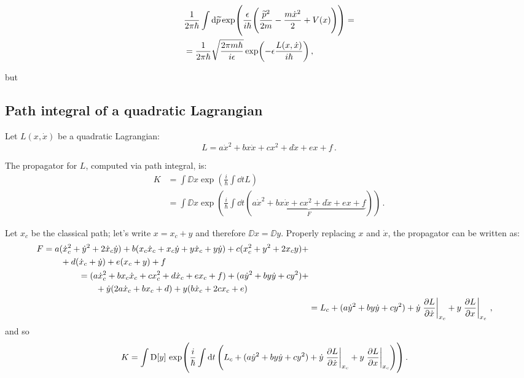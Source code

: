 \documentclass[main.tex]{subfiles}
\begin{document}
%
\begin{subequations}
\begin{align}
  &\frac{1}{2 \pi \hbar} \int  \dd{\widetilde{p}} 
  \exp(\frac{\epsilon}{i \hbar} \qty(\frac{\widetilde{p}^2 }{2m} - \frac{m \dot{x}^2}{2} + V(x))) =  \\
  &= \frac{1}{2 \pi \hbar} \sqrt{\frac{2 \pi m \hbar }{i \epsilon }} \exp(- \epsilon  \frac{L(x, \dot{x})}{i \hbar}) 
  \,,
\end{align}
\end{subequations}

but 

\subsection{Path integral of a quadratic Lagrangian}

Let \(L(x,\dot{x})\) be a quadratic Lagrangian:
\begin{equation}
  L = a\dot{x}^2 + bx\dot{x} + cx^2 + d\dot{x} + ex + f
  \,.
\end{equation}

The propagator for $L$, computed via path integral, is:
%
\begin{subequations}
  \begin{align}
    K &= \int\DD{x} \exp(\frac{i}{\hbar}\int \dd{t} L) \\
    &= \int\DD{x} \exp(\frac{i}{\hbar}\int \dd{t} ( \underbrace{a\dot{x}^2 + bx\dot{x} + cx^2 + d\dot{x} + ex + f}_F) )
    \,.
  \end{align}
\end{subequations}

Let $x_c$ be the classical path; let's write $x = x_c + y$ and therefore $\DD{x} = \DD{y}$. Properly replacing $x$ and $\dot{x}$, the propagator can be written as:
%
\begin{subequations}
\begin{align}
\begin{split}
F &= a (\dot{x}_c^2+\dot{y}^2+2\dot{x}_c\dot{y}) + b(x_c\dot{x}_c+x_c\dot{y}+y\dot{x}_c+y\dot{y}) + c(x_c^2+y^2+2x_cy) +\\&\qquad+ d(\dot{x}_c+\dot{y}) + e(x_c+y) + f
\end{split} \\
\begin{split}
&= (a\dot{x}_c^2+bx_c\dot{x}_c+cx_c^2+d\dot{x}_c+ex_c+f) + (a\dot{y}^2 + by\dot{y} + cy^2) + \\&\qquad + \dot{y} ( 2a\dot{x}_c + bx_c + d ) +y (b\dot{x}_c + 2cx_c + e) \end{split}\\
&= L_c + (a\dot{y}^2 + by\dot{y} + cy^2) + \dot{y} \eval{\pdv{L}{\dot{x}}}_{x_c} + y \eval{\pdv{L}{x}}_{x_c}
\,,
\end{align}
\end{subequations}
%
and so
%
\begin{align}
K &= \int\DD{y} \exp( \frac{i}{\hbar}\int \dd{t} \left( L_c + (a\dot{y}^2 + by\dot{y} + cy^2) + \dot{y} \eval{\pdv{L}{\dot{x}}}_{x_c} + y \eval{\pdv{L}{x}}_{x_c} \right) )
\,.
\end{align}
\end{document}

